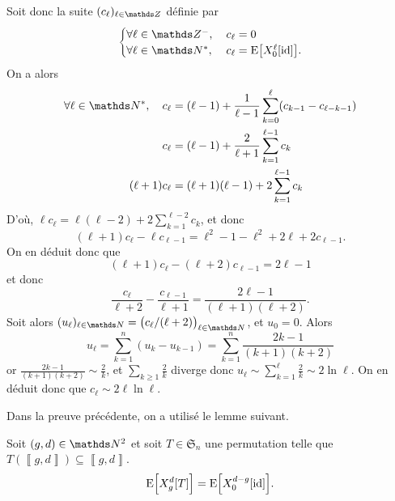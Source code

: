 \begin{prv}
\begin{itemize}
\begin{itemize}
					Soit donc la suite $(c_\ell)_{\ell\in\Z}$\/ définie par \[
						\begin{cases}
							\forall \ell \in \Z^-,\:&c_\ell = 0\\
							\forall \ell \in \N^*,\:&c_\ell = \mathrm{E}\big[X_0^\ell[\id]\big].
						\end{cases}
					\] On a alors
					\begin{align*}
						\forall \ell \in \N^*,\quad c_\ell &= (\ell-1) + \frac{1}{\ell - 1} \sum_{k=0}^\ell (c_{k-1} - c_{\ell - k - 1}) \\
						c_\ell&= (\ell - 1) + \frac{2}{\ell+1} \sum_{k=1}^{\ell-1} c_k \\
						(\ell + 1) c_\ell &= (\ell + 1)(\ell - 1) + 2 \sum_{k=1}^{\ell - 1} c_k \\
					\end{align*}
					D'où, $\ell c_\ell = \ell(\ell - 2) + 2 \sum_{k=1}^{\ell - 2} c_k$, et donc \[
						(\ell + 1) c_\ell - \ell c_{\ell - 1} = \ell^2 - 1 - \ell^2 + 2 \ell + 2 c_{\ell - 1}
					.\] On en déduit donc que \[
						(\ell + 1) c_\ell - (\ell + 2) c_{\ell - 1} = 2 \ell - 1
					\] et donc \[
						\frac{c_\ell}{\ell + 2} - \frac{c_{\ell - 1}}{\ell + 1} = \frac{2 \ell - 1}{(\ell + 1)(\ell + 2)}
					.\]
					Soit alors $(u_\ell)_{\ell\in\N} = \big(c_\ell / (\ell + 2)\big)_{\ell \in \N}$, et $u_0 = 0$. Alors \[
						u_\ell = \sum_{k=1}^n (u_k - u_{k-1}) = \sum_{k=1}^n \frac{2 k -1}{(k+1)(k+2)}
					\] or $\frac{2k - 1}{(k+1)(k+2)} \sim \frac{2}{k}$, et $\sum_{k\ge 1} \frac{2}{k}$\/ diverge donc $u_\ell \sim \sum_{k=1}^\ell \frac{2}{k} \sim 2 \ln \ell$. On en déduit donc que $c_\ell \sim 2 \ell \ln \ell$.
			\end{itemize}
	\end{itemize}
\end{prv}

\eject

Dans la preuve précédente, on a utilisé le lemme suivant.

\begin{lem}
	Soit $(g,d) \in \N^2$\/ et soit $T \in \mathfrak{S}_n$ une permutation telle que $T(\left\llbracket g,d \right\rrbracket) \subseteq \left\llbracket g,d \right\rrbracket$. \[
		\mathrm{E}\Big[X_g^d[T]\Big] = \mathrm{E}\Big[X_0^{d-g}[\operatorname{id}]\Big]
	.\]
\end{lem}

